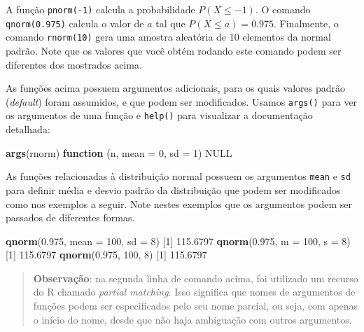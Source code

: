 \documentclass[10pt,a4paper]{book}
\newenvironment{Shaded}{\begin{snugshade}}{\end{snugshade}}
\newcommand{\KeywordTok}[1]{\textcolor[rgb]{0.13,0.29,0.53}{\textbf{#1}}}
\newcommand{\DataTypeTok}[1]{\textcolor[rgb]{0.13,0.29,0.53}{#1}}
\newcommand{\DecValTok}[1]{\textcolor[rgb]{0.00,0.00,0.81}{#1}}
\newcommand{\FloatTok}[1]{\textcolor[rgb]{0.00,0.00,0.81}{#1}}
\newcommand{\OtherTok}[1]{\textcolor[rgb]{0.56,0.35,0.01}{#1}}
\newcommand{\ControlFlowTok}[1]{\textcolor[rgb]{0.13,0.29,0.53}{\textbf{#1}}}
\newcommand{\NormalTok}[1]{#1}
\begin{document}
A função \texttt{pnorm(-1)} calcula a probabilidade \(P(X \leq -1)\). O
comando \texttt{qnorm(0.975)} calcula o valor de \(a\) tal que
\(P(X \leq a) = 0.975\). Finalmente, o comando \texttt{rnorm(10)} gera
uma amostra aleatória de 10 elementos da normal padrão. Note que os
valores que você obtém rodando este comando podem ser diferentes dos
mostrados acima.

As funções acima possuem argumentos adicionais, para os quais valores
padrão (\emph{default}) foram assumidos, e que podem ser modificados.
Usamos \texttt{args()} para ver os argumentos de uma função e
\texttt{help()} para visualizar a documentação detalhada:

\begin{Shaded}
\begin{Highlighting}[]
\KeywordTok{args}\NormalTok{(rnorm)}
\ControlFlowTok{function}\NormalTok{ (n, }\DataTypeTok{mean =} \DecValTok{0}\NormalTok{, }\DataTypeTok{sd =} \DecValTok{1}\NormalTok{) }
\OtherTok{NULL}
\end{Highlighting}
\end{Shaded}

As funções relacionadas à distribuição normal possuem os argumentos
\texttt{mean} e \texttt{sd} para definir média e desvio padrão da
distribuição que podem ser modificados como nos exemplos a seguir. Note
nestes exemplos que os argumentos podem ser passados de diferentes
formas.

\begin{Shaded}
\begin{Highlighting}[]
\KeywordTok{qnorm}\NormalTok{(}\FloatTok{0.975}\NormalTok{, }\DataTypeTok{mean =} \DecValTok{100}\NormalTok{, }\DataTypeTok{sd =} \DecValTok{8}\NormalTok{)}
\NormalTok{[}\DecValTok{1}\NormalTok{] }\FloatTok{115.6797}
\KeywordTok{qnorm}\NormalTok{(}\FloatTok{0.975}\NormalTok{, }\DataTypeTok{m =} \DecValTok{100}\NormalTok{, }\DataTypeTok{s =} \DecValTok{8}\NormalTok{)}
\NormalTok{[}\DecValTok{1}\NormalTok{] }\FloatTok{115.6797}
\KeywordTok{qnorm}\NormalTok{(}\FloatTok{0.975}\NormalTok{, }\DecValTok{100}\NormalTok{, }\DecValTok{8}\NormalTok{)}
\NormalTok{[}\DecValTok{1}\NormalTok{] }\FloatTok{115.6797}
\end{Highlighting}
\end{Shaded}

\begin{quote}
\textbf{Observação}: na segunda linha de comando acima, foi utilizado um
recurso do R chamado \emph{partial matching}. Isso significa que nomes
de argumentos de funções podem ser especificados pelo seu nome parcial,
ou seja, com apenas o início do nome, desde que não haja ambiguação com
outros argumentos.
\end{quote}
\end{document}
